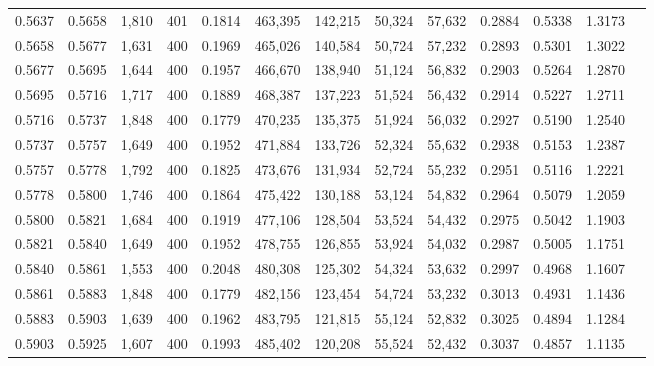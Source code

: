 \begin{tabular}{rrrrrrrrrrrrr}
0.5637 & 0.5658 &  1,810 & 401 &                                     0.1814 & 463,395 & 142,215 &  50,324 &  57,632 & 0.2884 & 0.5338 & 1.3173 \\
0.5658 & 0.5677 &  1,631 & 400 &                                     0.1969 & 465,026 & 140,584 &  50,724 &  57,232 & 0.2893 & 0.5301 & 1.3022 \\
0.5677 & 0.5695 &  1,644 & 400 &                                     0.1957 & 466,670 & 138,940 &  51,124 &  56,832 & 0.2903 & 0.5264 & 1.2870 \\
0.5695 & 0.5716 &  1,717 & 400 &                                     0.1889 & 468,387 & 137,223 &  51,524 &  56,432 & 0.2914 & 0.5227 & 1.2711 \\
0.5716 & 0.5737 &  1,848 & 400 &                                     0.1779 & 470,235 & 135,375 &  51,924 &  56,032 & 0.2927 & 0.5190 & 1.2540 \\
0.5737 & 0.5757 &  1,649 & 400 &                                     0.1952 & 471,884 & 133,726 &  52,324 &  55,632 & 0.2938 & 0.5153 & 1.2387 \\
0.5757 & 0.5778 &  1,792 & 400 &                                     0.1825 & 473,676 & 131,934 &  52,724 &  55,232 & 0.2951 & 0.5116 & 1.2221 \\
0.5778 & 0.5800 &  1,746 & 400 &                                     0.1864 & 475,422 & 130,188 &  53,124 &  54,832 & 0.2964 & 0.5079 & 1.2059 \\
0.5800 & 0.5821 &  1,684 & 400 &                                     0.1919 & 477,106 & 128,504 &  53,524 &  54,432 & 0.2975 & 0.5042 & 1.1903 \\
0.5821 & 0.5840 &  1,649 & 400 &                                     0.1952 & 478,755 & 126,855 &  53,924 &  54,032 & 0.2987 & 0.5005 & 1.1751 \\
0.5840 & 0.5861 &  1,553 & 400 &                                     0.2048 & 480,308 & 125,302 &  54,324 &  53,632 & 0.2997 & 0.4968 & 1.1607 \\
0.5861 & 0.5883 &  1,848 & 400 &                                     0.1779 & 482,156 & 123,454 &  54,724 &  53,232 & 0.3013 & 0.4931 & 1.1436 \\
0.5883 & 0.5903 &  1,639 & 400 &                                     0.1962 & 483,795 & 121,815 &  55,124 &  52,832 & 0.3025 & 0.4894 & 1.1284 \\
0.5903 & 0.5925 &  1,607 & 400 &                                     0.1993 & 485,402 & 120,208 &  55,524 &  52,432 & 0.3037 & 0.4857 & 1.1135 \\

\end{tabular}
